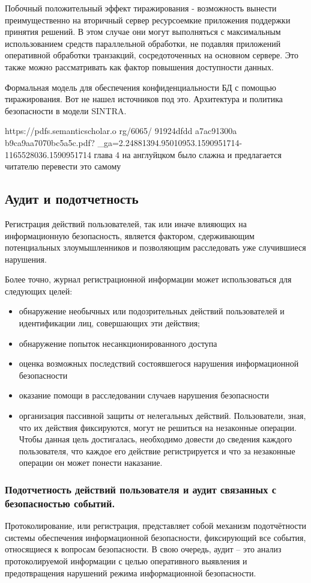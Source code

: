 Побочный положительный эффект тиражирования - возможность вынести преимущественно на вторичный сервер ресурсоемкие приложения поддержки принятия решений. В этом случае они могут выполняться с максимальным использованием средств параллельной обработки, не подавляя приложений оперативной обработки транзакций, сосредоточенных на основном сервере. Это также можно рассматривать как фактор повышения доступности данных.

Формальная модель для обеспечения конфиденциальности БД с помощью тиражирования.
Вот не нашел источников под это.
Архитектура и политика безопасности в модели SINTRA.

https://pdfs.semanticscholar.o
rg/6065/
91924dfdd
a7ac91300a
b9ca9aa7070bc5a5c.pdf?
\_ga=2.24881394.95010953.1590951714-1165528036.1590951714 глава 4 на англуйцком было слажна и предлагается читателю перевести это самому
\subsection{Аудит и подотчетность}
Регистрация действий пользователей, так или иначе влияющих на информационную безопасность, является фактором, сдерживающим потенциальных злоумышленников и позволяющим расследовать уже случившиеся нарушения.

Более точно, журнал регистрационной информации может использоваться для следующих целей:
\begin{itemize}
    \item обнаружение необычных или подозрительных действий пользователей и идентификации лиц, совершающих эти действия;
    \item обнаружение попыток несанкционированного доступа
    \item оценка возможных последствий состоявшегося нарушения информационной безопасности
    \item оказание помощи в расследовании случаев нарушения безопасности
    \item организация пассивной защиты от нелегальных действий. Пользователи, зная, что их действия фиксируются, могут не решиться на незаконные операции. Чтобы данная цель достигалась, необходимо довести до сведения каждого пользователя, что каждое его действие регистрируется и что за незаконные операции он может понести наказание.
\end{itemize}



\subsubsection{Подотчетность действий пользователя и аудит связанных с безопасностью событий.}
Протоколирование, или регистрация, представляет собой механизм подотчётности системы обеспечения информационной безопасности, фиксирующий все события, относящиеся к вопросам безопасности. В свою очередь, аудит – это анализ протоколируемой информации с целью оперативного выявления и предотвращения нарушений режима информационной безопасности.

